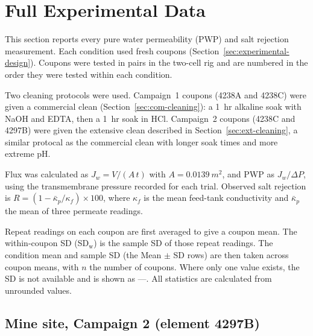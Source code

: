 \section{Full Experimental Data}
\label{app:exp-data}

This section reports every pure water permeability (PWP) and salt rejection measurement. Each condition used fresh coupons (Section~\ref{sec:experimental-design}). Coupons were tested in pairs in the two-cell rig and are numbered in the order they were tested within each condition.

Two cleaning protocols were used. Campaign~1 coupons (4238A and 4238C) were given a commercial clean (Section~\ref{sec:com-cleaning}): a 1~hr alkaline soak with NaOH and EDTA, then a 1~hr soak in HCl. 
Campaign~2 coupons (4238C and 4297B) were given the extensive clean described in Section~\ref{sec:ext-cleaning}, a similar protocal as the commercial clean with longer soak times and more extreme pH.

Flux was calculated as $J_w = V/(A\,t)$ with $A = \qty{0.0139}{m^2}$, and PWP as $J_w/\Delta P$, using the transmembrane pressure recorded for each trial. Observed salt rejection is $R = (1-\bar{\kappa}_p/\kappa_f)\times 100$, where $\kappa_f$ is the mean feed-tank conductivity and $\bar{\kappa}_p$ the mean of three permeate readings.

Repeat readings on each coupon are first averaged to give a coupon mean. The within-coupon SD (SD$_\mathrm{w}$) is the sample SD of those repeat readings. The condition mean and sample SD (the Mean $\pm$ SD rows) are then taken across coupon means, with $n$ the number of coupons. Where only one value exists, the SD is not available and is shown as ---. All statistics are calculated from unrounded values.

\subsection{Mine site, Campaign 2 (element 4297B)}
\label{app:exp-c2-mine}

